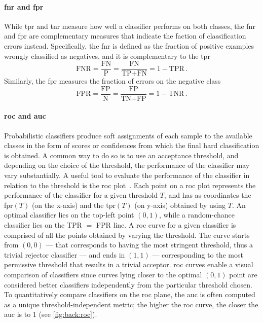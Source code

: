 \paragraph{\acrshort{fnr} and \acrshort{fpr}}
While \gls{tpr} and \gls{tnr} measure how well a classifier performs on both classes, the \gls{fnr} and \gls{fpr} are complementary measures that indicate the faction of classification errors instead.
Specifically, the \gls{fnr} is defined as the fraction of positive examples wrongly classified as negatives, and it is complementary to the \gls{tpr}
\begin{equation} \label{eq:back:fnr}
    \text{FNR} = \frac{\text{FN}}{\text{P}} = \frac{\text{FN}}{\text{TP} + \text{FN}} = 1 - \text{TPR}\,.
\end{equation}
Similarly, the \gls{fpr} measures the fraction of errors on the negative class
\begin{equation} \label{eq:back:fpr}
    \text{FPR} = \frac{\text{FP}}{\text{N}} = \frac{\text{FP}}{\text{TN} + \text{FP}} = 1 - \text{TNR}\,.
\end{equation}

\paragraph{\acrshort{roc} and \acrshort{auc}}
Probabilistic classifiers produce soft assignments of each sample to the available classes in the form of scores or confidences from which the final hard classification is obtained.
A common way to do so is to use an acceptance threshold, and depending on the choice of the threshold, the performance of the classifier may vary substantially.
A useful tool to evaluate the performance of the classifier in relation to the threshold is the \gls{roc} plot~\cite{fawcett2006introduction}.
Each point on a \gls{roc} plot represents the performance of the classifier for a given threshold $T$, and has as coordinates the \gls{fpr}$(T)$ (on the x-axis) and the \gls{tpr}$(T)$ (on y-axis) obtained by using $T$.
An optimal classifier lies on the top-left point $(0,1)$, while a random-chance classifier lies on the TPR $=$ FPR line.
A \gls{roc} curve for a given classifier is comprised of all the points obtained by varying the threshold.
The curve starts from $(0,0)$ --- that corresponds to having the most stringent threshold, thus a trivial rejector classifier --- and ends in $(1,1)$ --- corresponding to the most permissive threshold that results in a trivial acceptor.
\Gls{roc} curves enable a visual comparison of classifiers since curves lying closer to the optimal $(0,1)$ point are considered better classifiers independently from the particular threshold chosen.
To quantitatively compare classifiers on the \gls{roc} plane, the \gls{auc} is often computed as a unique threshold-independent metric;
the higher the \gls{roc} curve, the closer the \gls{auc} is to 1 (see \ref{fig:back:roc}).

